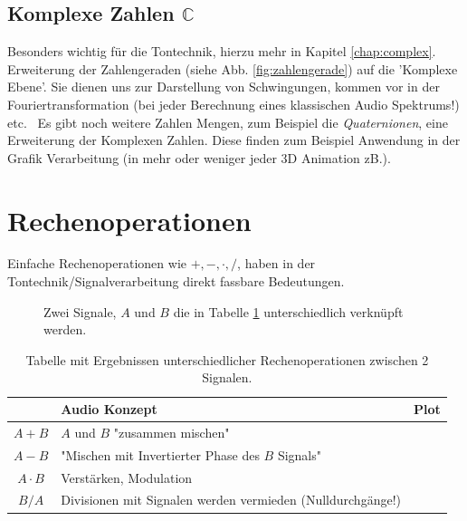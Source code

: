 \subsection{Komplexe Zahlen $\mathbb{C}$}
Besonders wichtig für die Tontechnik, hierzu mehr in Kapitel \ref{chap:complex}. Erweiterung der Zahlengeraden (siehe Abb. \ref{fig:zahlengerade}) auf die 'Komplexe Ebene'. Sie dienen uns zur Darstellung von Schwingungen, kommen vor in der Fouriertransformation (bei jeder Berechnung eines klassischen Audio Spektrums!) etc. \
Es gibt noch weitere Zahlen Mengen, zum Beispiel die \emph{Quaternionen}, eine Erweiterung der Komplexen Zahlen. Diese finden zum Beispiel Anwendung in der Grafik Verarbeitung (in mehr oder weniger jeder 3D Animation zB.). 



\section{Rechenoperationen}

Einfache Rechenoperationen wie $+, -, \cdot, / $, haben in der Tontechnik/Signalverarbeitung direkt fassbare Bedeutungen.


\begin{figure}[h!]
    \centering
        
    \caption{Zwei Signale, $A$ und $B$ die in Tabelle \ref{tab:rechen} unterschiedlich verknüpft werden.}
    \label{fig:signale}
\end{figure}

\begin{table}
\begin{center}
\begin{tabular}{|c|p{5cm}|c|}
    \hline
    \textbf{} & \textbf{Audio Konzept} & \textbf{Plot} \\
    \hline
    $A + B$ & $A$ und $B$ "zusammen mischen" &  \\
    \hline
    $A - B$ & "Mischen mit Invertierter Phase des $B$ Signals"&  \\
    \hline
    $A \cdot B$ & Verstärken, Modulation &  \\
    \hline
    $B / A$ & Divisionen mit Signalen werden vermieden (Nulldurchgänge!) &  \\
    \hline
\end{tabular}
\caption{Tabelle mit Ergebnissen unterschiedlicher Rechenoperationen zwischen 2 Signalen.}
\label{tab:rechen}
\end{center}
\end{table}

